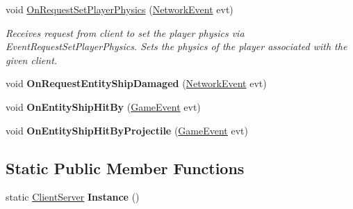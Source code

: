 \begin{DoxyCompactItemize}
void \hyperlink{class_skyrates_1_1_server_1_1_network_1_1_client_server_ab12fc7b88d98e13c6ea6bd00badde39f}{On\-Request\-Set\-Player\-Physics} (\hyperlink{class_skyrates_1_1_common_1_1_network_1_1_event_1_1_network_event}{Network\-Event} evt)
\begin{DoxyCompactList}\small\item\em Receives request from client to set the player physics via Event\-Request\-Set\-Player\-Physics. Sets the physics of the player associated with the given client. \end{DoxyCompactList}\item 
\hypertarget{class_skyrates_1_1_server_1_1_network_1_1_client_server_a6391f98a3985073546d38b4523eca432}{void {\bfseries On\-Request\-Entity\-Ship\-Damaged} (\hyperlink{class_skyrates_1_1_common_1_1_network_1_1_event_1_1_network_event}{Network\-Event} evt)}\label{class_skyrates_1_1_server_1_1_network_1_1_client_server_a6391f98a3985073546d38b4523eca432}

\item 
\hypertarget{class_skyrates_1_1_server_1_1_network_1_1_client_server_a7e9f838c7e76be903bb2a591c5d3d2f0}{void {\bfseries On\-Entity\-Ship\-Hit\-By} (\hyperlink{class_skyrates_1_1_client_1_1_game_1_1_event_1_1_game_event}{Game\-Event} evt)}\label{class_skyrates_1_1_server_1_1_network_1_1_client_server_a7e9f838c7e76be903bb2a591c5d3d2f0}

\item 
\hypertarget{class_skyrates_1_1_server_1_1_network_1_1_client_server_a0e87759acd9e27ba50d11645b54ce662}{void {\bfseries On\-Entity\-Ship\-Hit\-By\-Projectile} (\hyperlink{class_skyrates_1_1_client_1_1_game_1_1_event_1_1_game_event}{Game\-Event} evt)}\label{class_skyrates_1_1_server_1_1_network_1_1_client_server_a0e87759acd9e27ba50d11645b54ce662}

\end{DoxyCompactItemize}
\subsection*{Static Public Member Functions}
\begin{DoxyCompactItemize}
\item 
\hypertarget{class_skyrates_1_1_server_1_1_network_1_1_client_server_a2fd0b559183f128fbeabf0dfd9fe172f}{static \hyperlink{class_skyrates_1_1_server_1_1_network_1_1_client_server}{Client\-Server} {\bfseries Instance} ()}\label{class_skyrates_1_1_server_1_1_network_1_1_client_server_a2fd0b559183f128fbeabf0dfd9fe172f}

\end{DoxyCompactItemize}
